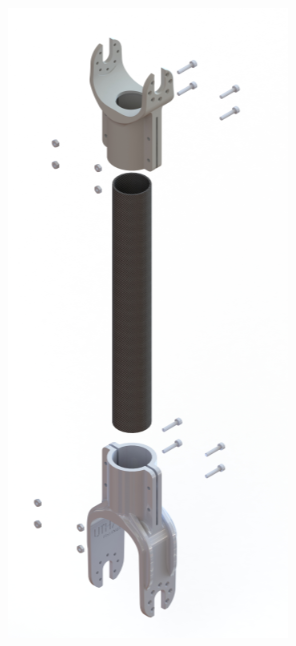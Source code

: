 \begin{figure}[h!]
    \centering
    \begin{subfigure}[b]{0.3\linewidth}
      \includegraphics[width=\linewidth]{chapter4/images/carb_shin.png}

\end{subfigure}
\end{figure}

